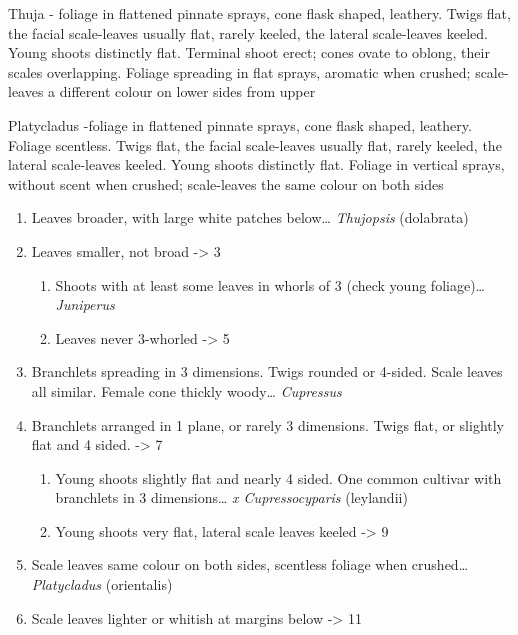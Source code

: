 \documentclass[openany]{book}
\providecommand{\tightlist}{%
  \setlength{\itemsep}{0pt}\setlength{\parskip}{0pt}}
\begin{document}
Thuja - foliage in flattened pinnate sprays, cone flask shaped,
leathery. Twigs flat, the facial scale-leaves usually flat, rarely
keeled, the lateral scale-leaves keeled. Young shoots distinctly flat.
Terminal shoot erect; cones ovate to oblong, their scales overlapping.
Foliage spreading in flat sprays, aromatic when crushed; scale-leaves a
different colour on lower sides from upper

Platycladus -foliage in flattened pinnate sprays, cone flask shaped,
leathery. Foliage scentless. Twigs flat, the facial scale-leaves usually
flat, rarely keeled, the lateral scale-leaves keeled. Young shoots
distinctly flat. Foliage in vertical sprays, without scent when crushed;
scale-leaves the same colour on both sides

\begin{enumerate}
\def\labelenumi{\arabic{enumi}.}
\tightlist
\item
  Leaves broader, with large white patches below\ldots{}
  \emph{Thujopsis} (dolabrata)
\item
  Leaves smaller, not broad -\textgreater{} 3

  \begin{enumerate}
  \def\labelenumii{\arabic{enumii}.}
  \setcounter{enumii}{2}
  \tightlist
  \item
    Shoots with at least some leaves in whorls of 3 (check young
    foliage)\ldots{} \emph{Juniperus}
  \item
    Leaves never 3-whorled -\textgreater{} 5
  \end{enumerate}
\item
  Branchlets spreading in 3 dimensions. Twigs rounded or 4-sided. Scale
  leaves all similar. Female cone thickly woody\ldots{} \emph{Cupressus}
\item
  Branchlets arranged in 1 plane, or rarely 3 dimensions. Twigs flat, or
  slightly flat and 4 sided. -\textgreater{} 7

  \begin{enumerate}
  \def\labelenumii{\arabic{enumii}.}
  \setcounter{enumii}{6}
  \tightlist
  \item
    Young shoots slightly flat and nearly 4 sided. One common cultivar
    with branchlets in 3 dimensions\ldots{} \emph{x Cupressocyparis}
    (leylandii)
  \item
    Young shoots very flat, lateral scale leaves keeled -\textgreater{}
    9
  \end{enumerate}
\item
  Scale leaves same colour on both sides, scentless foliage when
  crushed\ldots{} \emph{Platycladus} (orientalis)
\item
  Scale leaves lighter or whitish at margins below -\textgreater{} 11


\end{enumerate}
\end{document}
